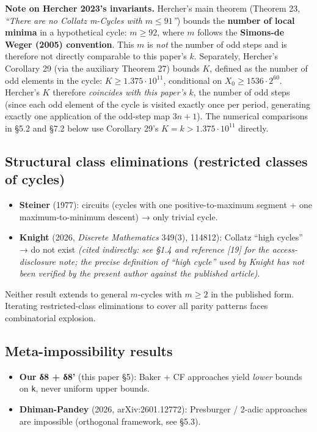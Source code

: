 \documentclass[
  11pt]{amsart}
\providecommand{\tightlist}{%
  \setlength{\itemsep}{0pt}\setlength{\parskip}{0pt}}
\theoremstyle{plain}
\theoremstyle{definition}
\theoremstyle{remark}
\begin{document}
\textbf{Note on Hercher 2023's invariants.} Hercher's main theorem
(Theorem 23, \emph{``There are no Collatz m-Cycles with
\(m \leq 91\)''}) bounds the \textbf{number of local minima} in a
hypothetical cycle: \(m \geq 92\), where \(m\) follows the
\textbf{Simons-de Weger (2005) convention}. This \(m\) is \emph{not} the
number of odd steps and is therefore not directly comparable to this
paper's \(k\). Separately, Hercher's Corollary 29 (via the auxiliary
Theorem 27) bounds \(K\), defined as the number of odd elements in the
cycle: \(K \geq 1.375 \cdot 10^{11}\), conditional on
\(X_0 \geq 1536 \cdot 2^{60}\). Hercher's \(K\) therefore
\emph{coincides with this paper's} \(k\), the number of odd steps (since
each odd element of the cycle is visited exactly once per period,
generating exactly one application of the odd-step map \(3n + 1\)). The
numerical comparisons in §5.2 and §7.2 below use Corollary 29's
\(K = k > 1.375 \cdot 10^{11}\) directly.

\subsection{Structural class eliminations (restricted classes of
cycles)}\label{structural-class-eliminations-restricted-classes-of-cycles}

\begin{itemize}
\tightlist
\item
  \textbf{Steiner} (1977): circuits (cycles with one positive-to-maximum
  segment + one maximum-to-minimum descent) → only trivial cycle.
\item
  \textbf{Knight} (2026, \emph{Discrete Mathematics} 349(3), 114812):
  Collatz ``high cycles'' → do not exist \emph{(cited indirectly: see
  §1.4 and reference {[}19{]} for the access-disclosure note; the
  precise definition of ``high cycle'' used by Knight has not been
  verified by the present author against the published article)}.
\end{itemize}

Neither result extends to general \(m\)-cycles with \(m \geq 2\) in the
published form. Iterating restricted-class eliminations to cover all
parity patterns faces combinatorial explosion.

\subsection{Meta-impossibility
results}\label{meta-impossibility-results}

\begin{itemize}
\tightlist
\item
  \textbf{Our δ8 + δ8'} (this paper §5): Baker + CF approaches yield
  \emph{lower} bounds on \texttt{k}, never uniform upper bounds.
\item
  \textbf{Dhiman-Pandey} (2026, arXiv:2601.12772): Presburger / 2-adic
  approaches are impossible (orthogonal framework, see §5.3).
\end{itemize}
\end{document}
